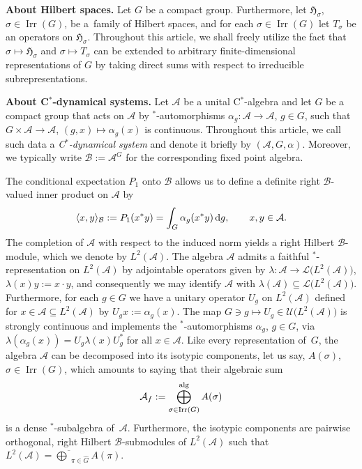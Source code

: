 \documentclass[10pt,a4paper]{amsart}
\numberwithin{equation}{section}
\DeclarePairedDelimiter{\scal}{\langle}{\rangle}	%
\newcommand*{\Star}{$^*$\nobreakdash}
\newcommand*{\hilb}{\mathfrak}		%
\newcommand*{\alg}{\mathcal}		%
\newcommand*{\hH}{\hilb{H}}			%
\newcommand*{\aA}{\alg{A}}			%
\newcommand*{\aB}{\alg{B}} 			%
\newcommand*{\End}{\mathcal{L}} %
\DeclareMathOperator{\Irrep}{Irr} 			%
\begin{document}
{\bf About Hilbert spaces.}
Let $G$ be a compact group.
Furthermore, let $\hH_\sigma$, $\sigma \in \Irrep(G)$, be a~family of Hilbert spaces, and for each $\sigma \in \Irrep(G)$ let $T_\sigma$ be an operators on $\hH_\sigma$.
Throughout this article, we shall freely utilize the fact that $\sigma \mapsto \hH_\sigma$ and $\sigma \mapsto T_\sigma$ can be extended to arbitrary finite-dimensional representations of $G$ by taking direct sums with respect to irreducible subrepresentations.

{\bf About C\Star-dynamical systems.}
Let $\aA$ be a unital C\Star-algebra and let $G$ be a compact group that acts on $\aA$ by \Star-automorphisms $\alpha_g\colon \aA \to \aA$, $g \in G$, such that $G \times \aA \to \aA$, $(g,x) \mapsto \alpha_g(x)$ is continuous.
Throughout this article, we call such data a \emph{C\Star-dynamical system} and denote it briefly by $(\aA,G,\alpha)$.
Moreover, we typically write $\aB := \aA^G$ for the corresponding fixed point algebra.

The conditional expectation $P_1$ onto $\aB$ allows us to define a definite right $\aB$\nobreakdash-valued inner product on $\aA$ by
\begin{gather*}
	\scal{x,y}_\aB := P_1(x^*y) = \int_G \alpha_g(x^*y) \, {\rm d}g,
	\qquad
	x,y \in \aA.
\end{gather*}
The completion of $\aA$ with respect to the induced norm yields a right Hilbert $\aB$\nobreakdash-module, which we denote by $L^2(\aA)$.
The algebra $\aA$ admits a faithful \Star-representation on $L^2(\aA)$ by adjointable operators given by $\lambda\colon \aA \to \End \big( L^2(\aA) \big)$, $\lambda(x)y := x \cdot y$, and consequently we may identify $\aA$ with $\lambda(\aA) \subseteq \End \big( L^2(\aA) \big)$.
Furthermore, for each $g \in G$ we have a unitary operator $U_g$ on $L^2(\aA)$ defined for $x \in \aA \subseteq L^2(\aA)$ by $U_g x := \alpha_g(x)$.
The map $G \ni g \mapsto U_g \in \mathcal{U}\big( L^2(\aA) \big)$ is strongly continuous and implements the \Star-automorphisms $\alpha_g$, $g \in G$, via $\lambda ( \alpha_g(x)) = U_g \lambda(x) U_g^*$ for all $x \in \aA$.
Like every representation of~$G$, the algebra $\aA$ can be decomposed into its isotypic components, let us say, $A(\sigma)$, $\sigma \in \Irrep(G)$, which amounts to saying that their algebraic sum
\begin{gather*}
	\aA_f:= \bigoplus_{\sigma \in \Irrep(G)}^{\rm alg} A(\sigma)
\end{gather*}
is a dense \Star-subalgebra of~$\aA$.
Furthermore, the isotypic components are pairwise orthogonal, right Hilbert $\aB$-submodules of $L^2(\aA)$ such that $L^2(\aA) = \overline{\bigoplus}_{\pi \in \hat G} A(\pi)$.
\end{document}
